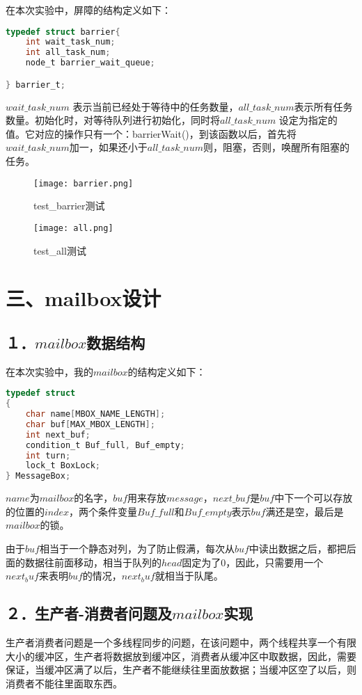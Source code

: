 \documentclass[UTF8,noindent]{ctexart}
\begin{document}
在本次实验中，屏障的结构定义如下：
\begin{lstlisting}[language = c]
typedef struct barrier{
	int wait_task_num;
	int all_task_num;
	node_t barrier_wait_queue;

} barrier_t;
\end{lstlisting}
$wait\_task\_num$ 表示当前已经处于等待中的任务数量，$all\_task\_num$表示所有任务数量。初始化时，对等待队列进行初始化，同时将$all\_task\_num$ 设定为指定的值。它对应的操作只有一个：barrierWait()，到该函数以后，首先将$wait\_task\_num$加一，如果还小于$all\_task\_num$则，阻塞，否则，唤醒所有阻塞的任务。

\begin{figure}[H]
  \centering
  \texttt{[image: barrier.png]}
  \caption{test\_barrier测试}
\end{figure}

\begin{figure}[H]
  \centering
  \texttt{[image: all.png]}
  \caption{test\_all测试}
\end{figure}

\section*{三、mailbox设计}
\subsection*{１．$mailbox$数据结构}
在本次实验中，我的$mailbox$的结构定义如下：
\begin{lstlisting}[language=c]
typedef struct
{
	char name[MBOX_NAME_LENGTH];
	char buf[MAX_MBOX_LENGTH];
	int next_buf;
	condition_t Buf_full, Buf_empty;
	int turn;
	lock_t BoxLock;
} MessageBox;
\end{lstlisting}
$name$为$mailbox$的名字，$buf$用来存放$message$，$next\_buf$是$buf$中下一个可以存放的位置的$index$，两个条件变量$Buf\_full$和$Buf\_empty$表示$buf$满还是空，最后是$mailbox$的锁。

由于$buf$相当于一个静态对列，为了防止假满，每次从$buf$中读出数据之后，都把后面的数据往前面移动，相当于队列的$head$固定为了$0$，因此，只需要用一个$next_buf$来表明$buf$的情况，$next_buf$就相当于队尾。

\subsection*{２．生产者-消费者问题及$mailbox$实现}

生产者消费者问题是一个多线程同步的问题，在该问题中，两个线程共享一个有限大小的缓冲区，生产者将数据放到缓冲区，消费者从缓冲区中取数据，因此，需要保证，当缓冲区满了以后，生产者不能继续往里面放数据；当缓冲区空了以后，则消费者不能往里面取东西。
\end{document}
